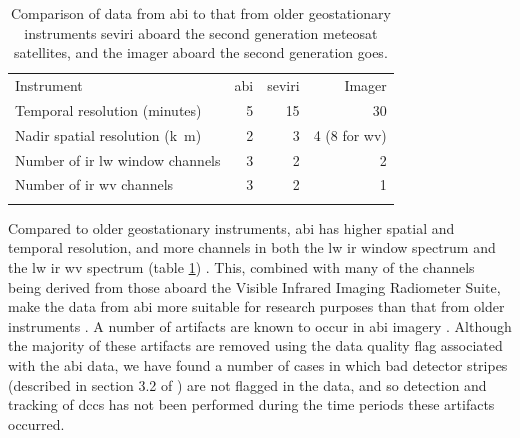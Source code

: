 \begin{table}[tb]
\centering
\begin{tabular}{lrrr}
\tophline
Instrument                                              & \acrshort{abi}   & \acrshort{seviri}    & Imager \\
\middlehline
Temporal resolution (\unit{minutes})                    & 5     & 15        & 30 \\
Nadir spatial resolution (\unit{k m})                   & 2     & 3         & 4 (8 for \acrshort{wv}) \\
Number of \acrshort{ir} \acrshort{lw} window channels                         & 3     & 2         & 2 \\
Number of \acrshort{ir} \acrshort{wv} channels                                & 3     & 2         & 1 \\
\bottomhline
\end{tabular}
\caption[
Comparison of data from \acrshort{abi} to that from older geostationary instruments
]{
Comparison of data from \acrshort{abi} to that from older geostationary instruments\; \acrshort{seviri} aboard the second generation meteosat satellites, and the imager aboard the second generation \acrshort{goes}.
} %
\label{table:abi_comparison}
\end{table}

Compared to older geostationary instruments, \acrshort{abi} has higher spatial and temporal resolution, and more channels in both the \acrshort{lw} \acrshort{ir} window spectrum and the \acrshort{lw} \acrshort{ir} \acrfull{wv} spectrum (table \ref{table:abi_comparison}) \citep{iacovazzi_goes-16_2020}.
This, combined with many of the channels being derived from those aboard the Visible Infrared Imaging Radiometer Suite, make the data from \acrshort{abi} more suitable for research purposes than that from older instruments \citep{heidinger_chapter_2020}.
A number of artifacts are known to occur in \acrshort{abi} imagery \citep{gunshor_goes-r_2020}.
Although the majority of these artifacts are removed using the data quality flag associated with the \acrshort{abi} data, we have found a number of cases in which bad detector stripes (described in section 3.2 of \citealp{gunshor_goes-r_2020}) are not flagged in the data, and so detection and tracking of \acrshort{dcc}s has not been performed during the time periods these artifacts occurred.

